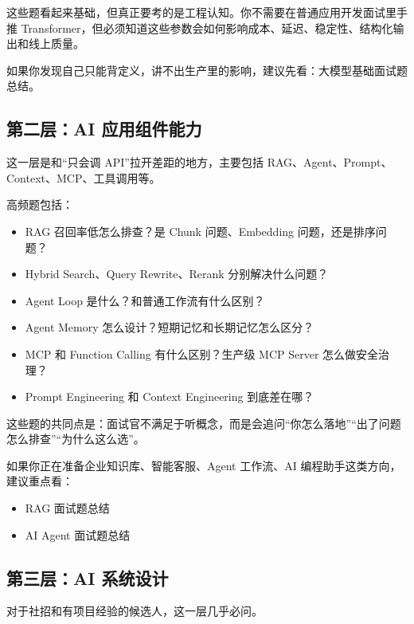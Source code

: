 \documentclass[9pt,a4paper,twocolumn]{ctexart}
\begin{document}
这些题看起来基础，但真正要考的是工程认知。你不需要在普通应用开发面试里手推 Transformer，但必须知道这些参数会如何影响成本、延迟、稳定性、结构化输出和线上质量。



如果你发现自己只能背定义，讲不出生产里的影响，建议先看：大模型基础面试题总结。



\subsection*{第二层：AI 应用组件能力}


这一层是和“只会调 API”拉开差距的地方，主要包括 RAG、Agent、Prompt、Context、MCP、工具调用等。



高频题包括：


\begin{itemize}[itemsep=1pt, topsep=2pt]
  \item RAG 召回率低怎么排查？是 Chunk 问题、Embedding 问题，还是排序问题？
  \item Hybrid Search、Query Rewrite、Rerank 分别解决什么问题？
  \item Agent Loop 是什么？和普通工作流有什么区别？
  \item Agent Memory 怎么设计？短期记忆和长期记忆怎么区分？
  \item MCP 和 Function Calling 有什么区别？生产级 MCP Server 怎么做安全治理？
  \item Prompt Engineering 和 Context Engineering 到底差在哪？
\end{itemize}


这些题的共同点是：面试官不满足于听概念，而是会追问“你怎么落地”“出了问题怎么排查”“为什么这么选”。



如果你正在准备企业知识库、智能客服、Agent 工作流、AI 编程助手这类方向，建议重点看：


\begin{itemize}[itemsep=1pt, topsep=2pt]
  \item RAG 面试题总结
  \item AI Agent 面试题总结
\end{itemize}


\subsection*{第三层：AI 系统设计}


对于社招和有项目经验的候选人，这一层几乎必问。
\end{document}
